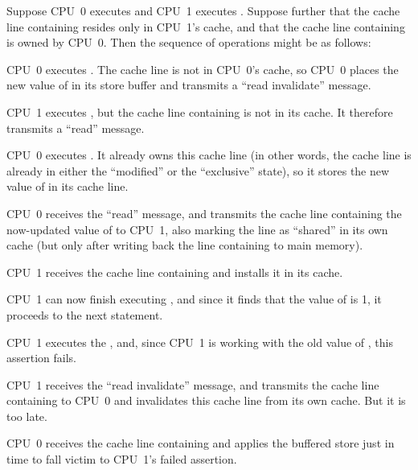 Suppose CPU~0 executes  and CPU~1 executes .
Suppose further that the cache line containing  resides only in CPU~1's
cache, and that the cache line containing  is owned by CPU~0.
Then the sequence of operations might be as follows:
\begin{sequence}
\item	CPU~0 executes .
	The cache line is not in CPU~0's cache, so CPU~0 places the new
	value of  in its store buffer and transmits a ``read
	invalidate'' message.
	\label{seq:app:whymb:Store Buffers and Memory Barriers}
\item	CPU~1 executes , but the cache line
	containing  is not in its cache.
	It therefore transmits a ``read'' message.
\item	CPU~0 executes .
	It already owns this cache line (in other words, the cache line
	is already in either the ``modified'' or the ``exclusive'' state),
	so it stores the new value of  in its cache line.
\item	CPU~0 receives the ``read'' message, and transmits the
	cache line containing the now-updated value of 
	to CPU~1, also marking the line as ``shared'' in its own cache
	(but only after writing back the line containing  to main
	memory).
	\label{seq:app:whymb:Store Buffers and Memory Barriers store}
\item	CPU~1 receives the cache line containing  and installs
	it in its cache.
\item	CPU~1 can now finish executing ,
	and since it finds that the value of  is 1, it proceeds
	to the next statement.
\item	CPU~1 executes the , and, since CPU~1 is
	working with the old value of , this assertion fails.
\item	CPU~1 receives the ``read invalidate'' message, and
	transmits the cache line containing  to CPU~0 and
	invalidates this cache line from its own cache.
	But it is too late.
\item	CPU~0 receives the cache line containing  and applies
	the buffered store just in time to fall victim to CPU~1's
	failed assertion.
	\label{seq:app:whymb:Store Buffers and Memory Barriers victim}
\end{sequence}

\EQuickQuizEnd

